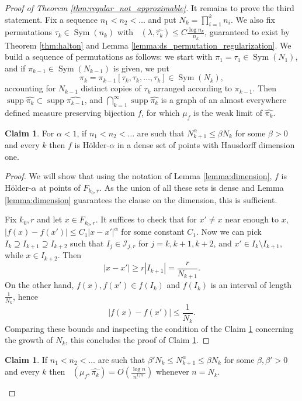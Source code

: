 \documentclass{article}
\newcommand{\Sym}{\mathop{\mathrm{Sym}}}
\newcommand{\ds}{\mathop{d_\square}}
\newcommand{\supp}{\mathop{\mathrm{supp}}}
\theoremstyle{definition}
\newtheorem{claim}[theorem]{Claim}
\begin{document}
\begin{proof}[Proof of Theorem \ref{thm:regular_not_approximable}]
    It remains to prove the third statement. Fix a sequence $n_1< n_2< \dots$ and put $N_k = \prod_{i=1}^{k}n_i$. We also fix permutations $\tau_k \in \Sym(n_k)$ with $\ds(\lambda, \widehat{\tau_k})\leq C\frac{\log n_k}{n_k}$, guaranteed to exist by Theorem \ref{thm:halton} and Lemma \ref{lemma:ds_permutation_regularization}. We build a sequence of permutations as follows: we start with $\pi_1=\tau_1\in \Sym(N_1)$, and if $\pi_{k-1}\in \Sym(N_{k-1})$ is given, we put
    $$\pi_k = \pi_{k-1}[\tau_k, \tau_k, \dots, \tau_k]\in \Sym(N_k),$$
    accounting for $N_{k-1}$ distinct copies of $\tau_k$ arranged according to $\pi_{k-1}$.
    Then $\supp \widehat{\pi_k}\subset \supp \widehat{\pi_{k-1}}$, and $\bigcap_{k=1}^{\infty}\supp \widehat{\pi_k}$ is a graph of an almost everywhere defined measure preserving bijection $f$, for which $\mu_f$ is the weak limit of $\widehat{\pi_k}$.

    \begin{claim} \label{claim:controlled_growth_holder}
        For $\alpha<1$, if $n_1< n_2< \dots$ are such that $N_{k+1}^{\alpha}\leq \beta N_k$ for some $\beta>0$ and every $k$ then $f$ is Hölder-$\alpha$ in a dense set of points with Hausdorff dimension one.
    \end{claim}

    \begin{proof}
        We will show that using the notation of Lemma \ref{lemma:dimension}, $f$ is Hölder-$\alpha$ at points of $F_{k_0, r}$. As the union of all these sets is dense and Lemma \ref{lemma:dimension} guarantees the clause on the dimension, this is sufficient.

        Fix $k_0, r$ and let $x\in F_{k_0, r}$. It suffices to check that for $x'\neq x$ near enough to $x$, $|f(x)-f(x')|\leq C_1|x-x'|^{\alpha}$ for some constant $C_1$. Now we can pick $I_k\supseteq I_{k+1}\supseteq I_{k+2}$ such that $I_j\in \mathcal{I}_{j, r}$ for $j=k, k+1, k+2$, and $x'\in I_{k}\setminus I_{k+1}$, while $x\in I_{k+2}$. Then
         $$|x-x'|\geq r|I_{k+1}|=\frac{r}{N_{k+1}}.$$
        On the other hand, $f(x), f(x')\in f(I_k)$ and $f(I_k)$ is an interval of length $\frac{1}{N_k}$, hence
        $$|f(x)-f(x')|\leq \frac{1}{N_k}.$$
        Comparing these bounds and inspecting the condition of the Claim \ref{claim:controlled_growth_holder} concerning the growth of $N_k$, this concludes the proof of Claim \ref{claim:controlled_growth_holder}.
    \end{proof}

    \begin{claim} \label{claim:fast_growth_well_approximable}
        If $n_1< n_2< \dots$ are such that $\beta' N_k\leq N_{k+1}^{\alpha}\leq \beta N_k$ for some $\beta, \beta'>0$ and every $k$ then $\ds(\mu_f, \widehat{\pi_k})=O\left(\frac{\log n}{n^{1/\alpha}}\right)$ whenever $n=N_k$.
    \end{claim}


\end{proof}
\end{document}
